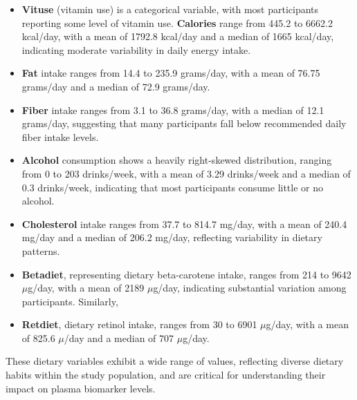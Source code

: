 \documentclass[12pt]{article}
\providecommand{\tightlist}{%
  \setlength{\itemsep}{0pt}\setlength{\parskip}{0pt}}
\begin{document}
\begin{itemize}
\tightlist
\item
  \textbf{Vituse} (vitamin use) is a categorical variable, with most
  participants reporting some level of vitamin use. \textbf{Calories}
  range from 445.2 to 6662.2 kcal/day, with a mean of 1792.8 kcal/day
  and a median of 1665 kcal/day, indicating moderate variability in
  daily energy intake.
\item
  \textbf{Fat} intake ranges from 14.4 to 235.9 grams/day, with a mean
  of 76.75 grams/day and a median of 72.9 grams/day.
\item
  \textbf{Fiber} intake ranges from 3.1 to 36.8 grams/day, with a median
  of 12.1 grams/day, suggesting that many participants fall below
  recommended daily fiber intake levels.
\item
  \textbf{Alcohol} consumption shows a heavily right-skewed
  distribution, ranging from 0 to 203 drinks/week, with a mean of 3.29
  drinks/week and a median of 0.3 drinks/week, indicating that most
  participants consume little or no alcohol.
\item
  \textbf{Cholesterol} intake ranges from 37.7 to 814.7 mg/day, with a
  mean of 240.4 mg/day and a median of 206.2 mg/day, reflecting
  variability in dietary patterns.
\item
  \textbf{Betadiet}, representing dietary beta-carotene intake, ranges
  from 214 to 9642 \(\mu\)g/day, with a mean of 2189 \(\mu\)g/day,
  indicating substantial variation among participants. Similarly,
\item
  \textbf{Retdiet}, dietary retinol intake, ranges from 30 to 6901
  \(\mu\)g/day, with a mean of 825.6 \(\mu\)/day and a median of 707
  \(\mu\)g/day.
\end{itemize}

These dietary variables exhibit a wide range of values, reflecting
diverse dietary habits within the study population, and are critical for
understanding their impact on plasma biomarker levels.



\end{document}

